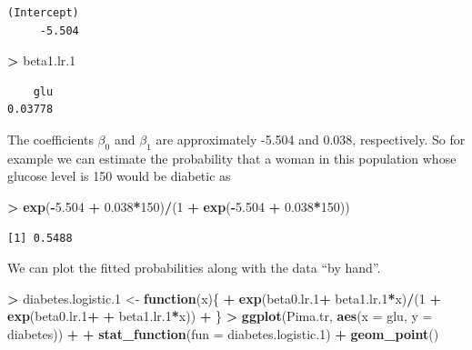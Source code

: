 \documentclass[
]{krantz}
\makeatletter
\newenvironment{Shaded}{\begin{snugshade}}{\end{snugshade}}
\newcommand{\ControlFlowTok}[1]{\textcolor[rgb]{0.27,0.27,0.27}{\textbf{#1}}}
\newcommand{\DataTypeTok}[1]{\textcolor[rgb]{0.27,0.27,0.27}{#1}}
\newcommand{\DecValTok}[1]{\textcolor[rgb]{0.06,0.06,0.06}{#1}}
\newcommand{\FloatTok}[1]{\textcolor[rgb]{0.06,0.06,0.06}{#1}}
\newcommand{\KeywordTok}[1]{\textcolor[rgb]{0.27,0.27,0.27}{\textbf{#1}}}
\newcommand{\NormalTok}[1]{#1}
\newcommand{\OperatorTok}[1]{\textcolor[rgb]{0.43,0.43,0.43}{\textbf{#1}}}
\newcommand{\StringTok}[1]{\textcolor[rgb]{0.5,0.5,0.5}{#1}}
\newenvironment{kframe}{%
\medskip{}
\setlength{\fboxsep}{.8em}
 \def\at@end@of@kframe{}%
 \ifinner\ifhmode%
  \def\at@end@of@kframe{\end{minipage}}%
  \begin{minipage}{\columnwidth}%
 \fi\fi%
 \def\FrameCommand##1{\hskip\@totalleftmargin \hskip-\fboxsep
 \colorbox{shadecolor}{##1}\hskip-\fboxsep
     \hskip-\linewidth \hskip-\@totalleftmargin \hskip\columnwidth}%
 \MakeFramed {\advance\hsize-\width
   \@totalleftmargin\z@ \linewidth\hsize
   \@setminipage}}%
 {\par\unskip\endMakeFramed%
 \at@end@of@kframe}
\renewenvironment{Shaded}{\begin{kframe}}{\end{kframe}}
\makeatother
\begin{document}
\begin{verbatim}
(Intercept) 
     -5.504 
\end{verbatim}

\begin{Shaded}
\begin{Highlighting}[]
\OperatorTok{\textgreater{}}\StringTok{ }\NormalTok{beta1.lr}\FloatTok{.1}
\end{Highlighting}
\end{Shaded}

\begin{verbatim}
    glu 
0.03778 
\end{verbatim}

The coefficients \(\beta_0\) and \(\beta_1\) are approximately -5.504 and
0.038, respectively. So for example we can estimate the probability that a woman in this population whose glucose level is 150 would be diabetic as

\begin{Shaded}
\begin{Highlighting}[]
\OperatorTok{\textgreater{}}\StringTok{ }\KeywordTok{exp}\NormalTok{(}\OperatorTok{{-}}\FloatTok{5.504} \OperatorTok{+}\StringTok{ }\FloatTok{0.038}\OperatorTok{*}\DecValTok{150}\NormalTok{)}\OperatorTok{/}\NormalTok{(}\DecValTok{1} \OperatorTok{+}\StringTok{ }\KeywordTok{exp}\NormalTok{(}\OperatorTok{{-}}\FloatTok{5.504} \OperatorTok{+}\StringTok{ }\FloatTok{0.038}\OperatorTok{*}\DecValTok{150}\NormalTok{))}
\end{Highlighting}
\end{Shaded}

\begin{verbatim}
[1] 0.5488
\end{verbatim}

We can plot the fitted probabilities along with the data ``by hand''.

\begin{Shaded}
\begin{Highlighting}[]
\OperatorTok{\textgreater{}}\StringTok{ }\NormalTok{diabetes.logistic}\FloatTok{.1}\NormalTok{ \textless{}{-}}\StringTok{ }\ControlFlowTok{function}\NormalTok{(x)\{}
\OperatorTok{+}\StringTok{   }\KeywordTok{exp}\NormalTok{(beta0.lr}\FloatTok{.1}\OperatorTok{+}\StringTok{ }\NormalTok{beta1.lr}\FloatTok{.1}\OperatorTok{*}\NormalTok{x)}\OperatorTok{/}\NormalTok{(}\DecValTok{1} \OperatorTok{+}\StringTok{ }\KeywordTok{exp}\NormalTok{(beta0.lr}\FloatTok{.1}\OperatorTok{+}\StringTok{ }
\OperatorTok{+}\StringTok{                                            }\NormalTok{beta1.lr}\FloatTok{.1}\OperatorTok{*}\NormalTok{x))}
\OperatorTok{+}\StringTok{ }\NormalTok{\}}
\OperatorTok{\textgreater{}}\StringTok{ }\KeywordTok{ggplot}\NormalTok{(Pima.tr, }\KeywordTok{aes}\NormalTok{(}\DataTypeTok{x =}\NormalTok{ glu, }\DataTypeTok{y =}\NormalTok{ diabetes)) }\OperatorTok{+}\StringTok{ }
\OperatorTok{+}\StringTok{   }\KeywordTok{stat\_function}\NormalTok{(}\DataTypeTok{fun =}\NormalTok{ diabetes.logistic}\FloatTok{.1}\NormalTok{) }\OperatorTok{+}\StringTok{ }\KeywordTok{geom\_point}\NormalTok{()}
\end{Highlighting}
\end{Shaded}
\end{document}
